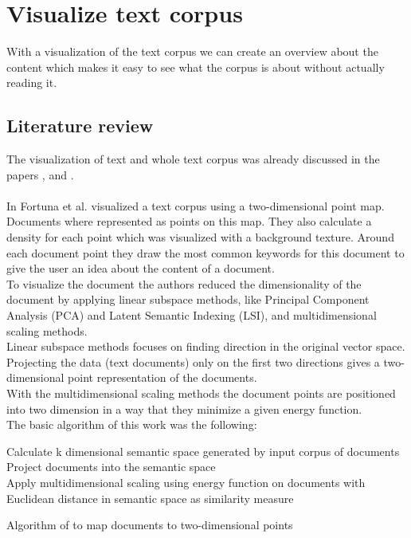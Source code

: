 \section{Visualize text corpus}

With a visualization of the text corpus we can create an overview about the content which makes it easy to see what the corpus is about without actually reading it. 

\subsection{Literature review}

The visualization of text and whole text corpus was already discussed in the papers  \cite{journals/informaticaSI/FortunaGM05},  \cite{doi:10.1117/12.647867} and \cite{visualiuationCorpus3}. \\
\\
In  \cite{visualiuationCorpus1} Fortuna et al. visualized a text corpus using a two-dimensional point map. Documents where represented as points on this map. They also calculate a density for each point which was visualized with a background texture. Around each document point they draw the most common keywords for this document to give the user an idea about the content of a document. \\
To visualize the document the authors reduced the dimensionality of the document by applying linear subspace methods, like Principal Component Analysis (PCA) and Latent Semantic Indexing (LSI), and multidimensional scaling methods. \\
Linear subspace methods focuses on finding direction in the original vector space. Projecting the data (text documents) only on the first two directions gives a
two-dimensional point representation of the documents. \\
With the multidimensional scaling methods the document points are positioned into two dimension in a way that they minimize a given energy function. \\
The basic algorithm of this work was the following: 
\begin{algorithm}
	
	 Calculate k dimensional semantic space generated by input corpus of documents \\
	 Project documents into the semantic space \\
	 Apply multidimensional scaling using energy function on documents with Euclidean distance in semantic space as similarity measure 
	
	\caption{Algorithm of \cite{journals/informaticaSI/FortunaGM05} to map documents to two-dimensional points}
\end{algorithm}

